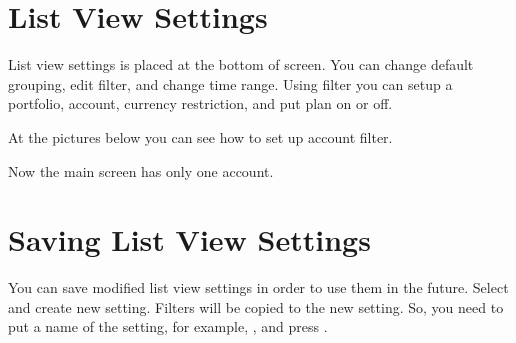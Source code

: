 \documentclass[a4paper,10pt,english]{sphinxmanual}
\begin{document}
\noindent{}

\noindent{}


\section{List View Settings}
\label{\detokenize{main-screen:list-view-settings}}
\sphinxAtStartPar
List view settings is placed at the bottom of screen. You can change default grouping,
edit filter, and change time range. Using filter you can setup a portfolio, account,
currency restriction, and put plan on or off.

\sphinxAtStartPar
At the pictures below you can see how to set up account filter.

\noindent{}

\noindent{}

\noindent{}

\noindent{}

\noindent{}

\noindent{}

\sphinxAtStartPar
Now the main screen has only one  account.


\section{Saving List View Settings}
\label{\detokenize{main-screen:saving-list-view-settings}}
\sphinxAtStartPar
You can save modified list view settings in order to use them in the future. Select
 and create new setting. Filters will be copied to the new setting.
So, you need to put a name of the setting, for example, , and
press .

\noindent{}
\end{document}
